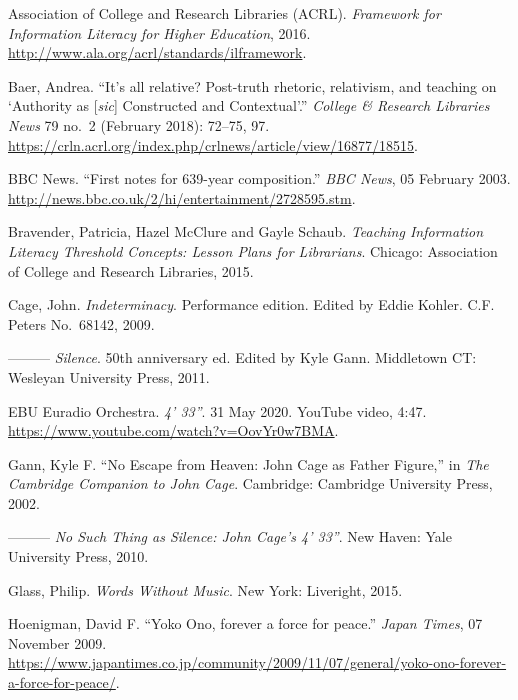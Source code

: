 \begin{mybiblist}

\small

\item Association of College and Research Libraries (ACRL).  \textit{Framework for Information Literacy for Higher Education}, 2016. \url{http://www.ala.org/acrl/standards/ilframework}.

\item Baer, Andrea. ``It's all relative? Post-truth rhetoric, relativism, and teaching on `Authority as [\textit{sic}] Constructed and Contextual'.'' \textit{College \& Research Libraries News} 79 no.\ 2 (February 2018): 72--75, 97.  \url{https://crln.acrl.org/index.php/crlnews/article/view/16877/18515}.

\item BBC News.  ``First notes for 639-year composition.''  \textit{BBC News}, 05 February 2003.  \url{http://news.bbc.co.uk/2/hi/entertainment/2728595.stm}.

\item Bravender, Patricia, Hazel McClure and Gayle Schaub.  \textit{Teaching Information Literacy Threshold Concepts: Lesson Plans for Librarians}.  Chicago: Association of College and Research Libraries, 2015.

\item Cage, John.  \textit{Indeterminacy}.  Performance edition.  Edited by Eddie Kohler.  C.F. Peters No.~68142, 2009.

\item ---------  \textit{Silence}.  50th anniversary ed. Edited by Kyle Gann.  Middletown CT: Wesleyan University Press, 2011.

\item EBU Euradio Orchestra. \textit{4' 33''}.  31 May 2020.  YouTube video, 4:47.  \url{https://www.youtube.com/watch?v=OovYr0w7BMA}.

\item Gann, Kyle F. ``No Escape from Heaven: John Cage as Father Figure,'' in \textit{The Cambridge Companion to John Cage}. Cambridge: Cambridge University Press, 2002.

\item ---------  \textit{No Such Thing as Silence: John Cage's \textit{4' 33''}}.  New Haven: Yale University Press, 2010.

\item Glass, Philip.  \textit{Words Without Music}.  New York: Liveright, 2015.

\item Hoenigman, David F.  ``Yoko Ono, forever a force for peace.'' \textit{Japan Times}, 07 November 2009. \url{https://www.japantimes.co.jp/community/2009/11/07/general/yoko-ono-forever-a-force-for-peace/}.


\end{mybiblist}
